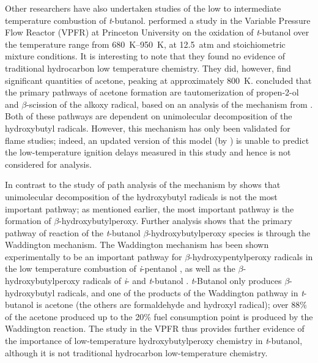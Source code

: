 \documentclass[12pt, letterpaper]{article}
\begin{document}
Other researchers have also undertaken studies of the low to intermediate
temperature combustion of \textit{t}-butanol. \textcite{Lefkowitz2012}
performed a study in the Variable Pressure Flow Reactor (VPFR) at Princeton
University on the oxidation of \textit{t}-butanol over the temperature range
from \SIrange{680}{950}{\kelvin}, at \SI{12.5}{atm} and stoichiometric mixture conditions. It is
interesting to note that they found no evidence of traditional hydrocarbon
low temperature chemistry. They did, however, find significant quantities of
acetone, peaking at approximately \SI{800}{\kelvin}. \textcite{Lefkowitz2012} concluded
that the primary pathways of acetone formation are tautomerization of
propen-2-ol and $\beta$-scission of the alkoxy radical, based on an analysis
of the mechanism from \textcite{Grana2010}. Both of these pathways are
dependent on unimolecular decomposition of the hydroxybutyl radicals. However,
this mechanism has only been validated for flame studies; indeed, an updated
version of this model (by \textcite{Frassoldati2012}) is unable to predict the
low-temperature ignition delays measured in this study and hence is not
considered for analysis.

In contrast to the study of \textcite{Lefkowitz2012} path analysis of the
mechanism by \textcite{Sarathy2012} shows that unimolecular decomposition
of the hydroxybutyl radicals is not the most important pathway; as mentioned
earlier, the most important pathway is the formation of
$\beta$-hydroxybutylperoxy. Further analysis shows that the primary pathway of
reaction of the \textit{t}-butanol $\beta$-hydroxybutylperoxy species is
through the Waddington mechanism. The Waddington mechanism has been shown
experimentally to be an important pathway for $\beta$-hydroxypentylperoxy
radicals in the low temperature combustion of \textit{i}-pentanol
\cite{Welz2012}, as well as the $\beta$-hydroxybutylperoxy radicals of
\textit{i}- and \textit{t}-butanol \cite{Welz2013b}. \textit{t}-Butanol only
produces $\beta$-hydroxybutyl radicals, and one of the products of the
Waddington pathway in \textit{t}-butanol is acetone (the others are
formaldehyde and hydroxyl radical); over 88\% of the acetone produced up to the
20\% fuel consumption point is produced by the Waddington reaction. The study
in the VPFR thus provides further evidence of the importance of low-temperature
hydroxybutylperoxy chemistry in \textit{t}-butanol, although it is not
traditional hydrocarbon low-temperature chemistry.
\end{document}
